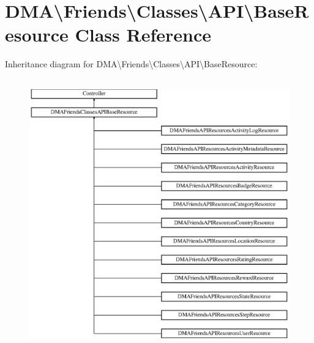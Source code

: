 \hypertarget{classDMA_1_1Friends_1_1Classes_1_1API_1_1BaseResource}{}\section{D\+M\+A\textbackslash{}Friends\textbackslash{}Classes\textbackslash{}A\+P\+I\textbackslash{}Base\+Resource Class Reference}
\label{classDMA_1_1Friends_1_1Classes_1_1API_1_1BaseResource}
Inheritance diagram for D\+M\+A\textbackslash{}Friends\textbackslash{}Classes\textbackslash{}A\+P\+I\textbackslash{}Base\+Resource\+:\begin{figure}[H]
\begin{center}
\leavevmode
\includegraphics[height=11.666667cm]{dc/d47/classDMA_1_1Friends_1_1Classes_1_1API_1_1BaseResource}
\end{center}
\end{figure}
